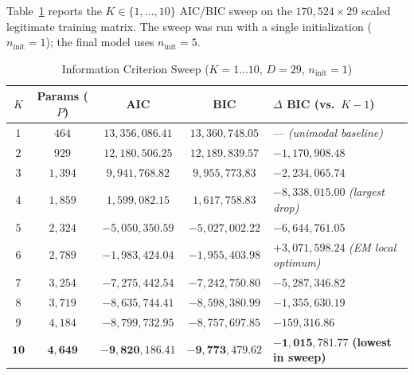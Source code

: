 \documentclass[11pt, a4paper]{article}
\begin{document}
Table~\ref{tab:aic_bic} reports the $K \in \{1,\dots,10\}$ AIC/BIC sweep on the $170{,}524 \times 29$ scaled legitimate training matrix. The sweep was run with a single initialization ($n_{\text{init}} = 1$); the final model uses $n_{\text{init}} = 5$.

\begin{table}[h!]
\centering
\caption{Information Criterion Sweep ($K = 1 \dots 10$, $D = 29$, $n_{\text{init}} = 1$)}
\vspace{0.2cm}
\renewcommand{\arraystretch}{1.22}
\small
\begin{tabular}{ccccl}
\toprule
\rowcolor{tableheader}
\textbf{$K$} & \textbf{Params ($P$)} & \textbf{AIC} & \textbf{BIC} & \textbf{$\Delta$ BIC (vs.\ $K-1$)} \\
\midrule
$1$ & $464$ & $13{,}356{,}086.41$ & $13{,}360{,}748.05$ & --- \textit{(unimodal baseline)} \\
\rowcolor{rowalt}
$2$ & $929$ & $12{,}180{,}506.25$ & $12{,}189{,}839.57$ & $-1{,}170{,}908.48$ \\
$3$ & $1{,}394$ & $9{,}941{,}768.82$ & $9{,}955{,}773.83$ & $-2{,}234{,}065.74$ \\
\rowcolor{rowalt}
$4$ & $1{,}859$ & $1{,}599{,}082.15$ & $1{,}617{,}758.83$ & $-8{,}338{,}015.00$ \textit{(largest drop)} \\
$5$ & $2{,}324$ & $-5{,}050{,}350.59$ & $-5{,}027{,}002.22$ & $-6{,}644{,}761.05$ \\
\rowcolor{rowalt}
$6$ & $2{,}789$ & $-1{,}983{,}424.04$ & $-1{,}955{,}403.98$ & $+3{,}071{,}598.24$ \textit{(EM local optimum)} \\
$7$ & $3{,}254$ & $-7{,}275{,}442.54$ & $-7{,}242{,}750.80$ & $-5{,}287{,}346.82$ \\
\rowcolor{rowalt}
$8$ & $3{,}719$ & $-8{,}635{,}744.41$ & $-8{,}598{,}380.99$ & $-1{,}355{,}630.19$ \\
$9$ & $4{,}184$ & $-8{,}799{,}732.95$ & $-8{,}757{,}697.85$ & $-159{,}316.86$ \\
\rowcolor{rowalt}
$\mathbf{10}$ & $\mathbf{4{,}649}$ & $\mathbf{-9{,}820{,}186.41}$ & $\mathbf{-9{,}773{,}479.62}$ & $\mathbf{-1{,}015{,}781.77}$ \textbf{(lowest in sweep)} \\
\bottomrule
\end{tabular}
\label{tab:aic_bic}
\end{table}
\end{document}
